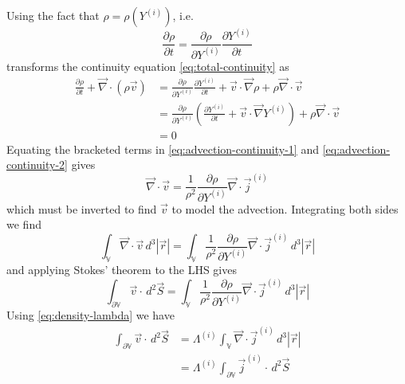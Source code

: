 \documentclass[12pt,twoside]{report}
\begin{document}
Using the fact that $\rho = \rho(Y^{(i)})$, i.e.\
\begin{equation*}
  \frac{\partial \rho}{\partial t} =
  \frac{\partial \rho}{\partial Y^{(i)}} \frac{\partial Y^{(i)}}{\partial t}
\end{equation*}
transforms the continuity equation \eqref{eq:total-continuity} as
\begin{equation}\label{eq:advection-continuity-2}
  \begin{aligned}
    \frac{\partial \rho}{\partial t} +
    \vec{\nabla} \cdot (\rho \vec{v})
    &=
    \frac{\partial \rho}{\partial Y^{(i)}} \frac{\partial Y^{(i)}}{\partial t} +
    \vec{v} \cdot \vec{\nabla} \rho +
    \rho \vec{\nabla} \cdot \vec{v} \\
    &=
    \frac{\partial \rho}{\partial Y^{(i)}}
    \left(
    \frac{\partial Y^{(i)}}{\partial t} +
    \vec{v} \cdot \vec{\nabla} Y^{(i)}
    \right) +
    \rho \vec{\nabla} \cdot \vec{v} \\
    &= 0
  \end{aligned}
\end{equation}
Equating the bracketed terms in \eqref{eq:advection-continuity-1} and \eqref{eq:advection-continuity-2} gives
\begin{equation}
  \vec{\nabla} \cdot \vec{v}
  =
  \frac{1}{\rho^2}
  \frac{\partial \rho}{\partial Y^{(i)}}
  \vec{\nabla} \cdot \vec{j}^{(i)}
\end{equation}
which must be inverted to find $\vec{v}$ to model the advection.
Integrating both sides we find
\begin{equation*}
  \int_{\mathbb{V}}
  \vec{\nabla} \cdot \vec{v}
  \, d^3|\vec{r}|
  =
  \int_{\mathbb{V}}
  \frac{1}{\rho^2}
  \frac{\partial \rho}{\partial Y^{(i)}}
  \vec{\nabla} \cdot \vec{j}^{(i)}
  \, d^3|\vec{r}|
\end{equation*}
and applying Stokes' theorem to the LHS gives
\begin{equation*}
  \int_{\partial \mathbb{V}}
  \vec{v} \cdot
  \, d^2\vec{S}
  =
  \int_{\mathbb{V}}
  \frac{1}{\rho^2}
  \frac{\partial \rho}{\partial Y^{(i)}}
  \vec{\nabla} \cdot \vec{j}^{(i)}
  \, d^3|\vec{r}|
\end{equation*}
Using \eqref{eq:density-lambda} we have
\begin{equation*}
  \begin{aligned}
  \int_{\partial \mathbb{V}}
  \vec{v} \cdot
  \, d^2\vec{S}
  &=
  \Lambda^{(i)}
  \int_{\mathbb{V}}
  \vec{\nabla} \cdot \vec{j}^{(i)}
  \, d^3|\vec{r}| \\
  &=
  \Lambda^{(i)}
  \int_{\partial \mathbb{V}}
  \vec{j}^{(i)} \cdot
  \, d^2\vec{S}
  \end{aligned}
\end{equation*}
\end{document}
